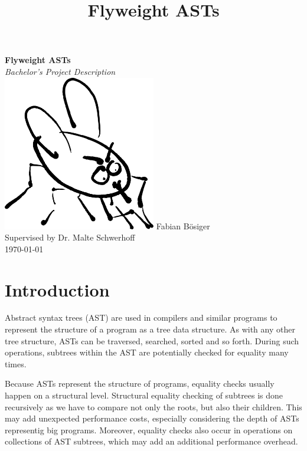 \documentclass[11pt]{article}
\title{Flyweight ASTs}
\author{
    
}
\date{}
\begin{document}
    \begin{titlepage}
        \begin{center}
            \textbf{\huge Flyweight ASTs}\\
            \vspace{0.2cm}
            \textit{Bachelor's Project Description}\\
            \vspace{1cm}
            \includegraphics[width=0.5\textwidth]{fly}
            \vfill   
            Fabian Bösiger\\
            Supervised by Dr. Malte Schwerhoff\\
            \vspace{0.2cm}
            \today
        \end{center}
    \end{titlepage}
    \newpage

    \section{Introduction} \label{introduction}
    Abstract syntax trees (AST) are used in compilers and similar programs to represent
    the structure of a program as a tree data structure. As with any other tree structure,
    ASTs can be traversed, searched, sorted and so forth. During such operations,
    subtrees within the AST are potentially checked for equality many times.
    
    Because ASTs represent the structure of programs, equality checks usually happen on a structural level.
    Structural equality checking of subtrees is done recursively as we have to compare not only the roots, but also their children. This may add unexpected performance costs,
    especially considering the depth of ASTs representig big programs. Moreover, equality checks
    also occur in operations on collections of AST subtrees, which may add an additional performance overhead.
\end{document}
